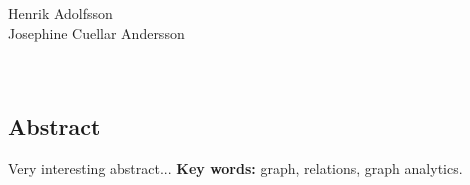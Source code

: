 
\noindent
\thesistitle\\
\thesissubtitle\\
\whatthisis\\
\\
\large{%
    Henrik Adolfsson\\
	Josephine Cuellar Andersson\\
}\\
\\
\large{%
	\whereandwhen
}

\vspace*{\fill}
\begin{center}
    \section*{Abstract}
\end{center}
Very interesting abstract... 
\newline
\noindent
\textbf{Key words:} graph, relations, graph analytics.